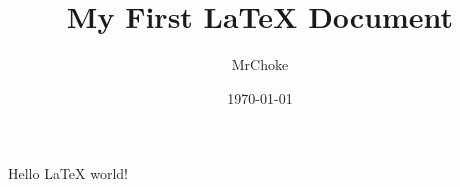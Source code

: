 \documentclass{article}
\title{My First \LaTeX{} Document}
\author{MrChoke}
\date{\today}
\begin{document}
   \maketitle
   Hello \LaTeX{}  world!
\end{document}

